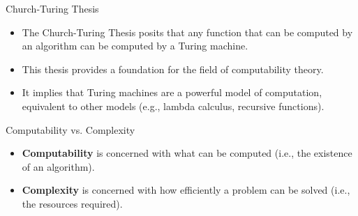 \documentclass{beamer}
\begin{document}
\begin{frame}{Church-Turing Thesis}
\begin{itemize}
    \item The Church-Turing Thesis posits that any function that can be computed by an algorithm can be computed by a Turing machine.
    \item This thesis provides a foundation for the field of computability theory.
    \item It implies that Turing machines are a powerful model of computation, equivalent to other models (e.g., lambda calculus, recursive functions).
\end{itemize}
\end{frame}

\begin{frame}{Computability vs. Complexity}
\begin{itemize}
    \item \textbf{Computability} is concerned with what can be computed (i.e., the existence of an algorithm).
    \item \textbf{Complexity} is concerned with how efficiently a problem can be solved (i.e., the resources required).

\end{itemize}
\end{frame}
\end{document}
